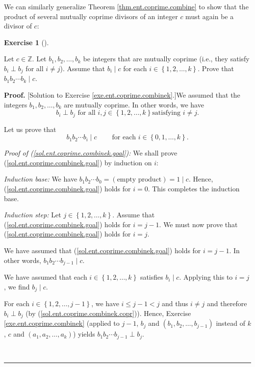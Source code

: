 \documentclass[numbers=enddot,12pt,final,onecolumn,notitlepage]{scrartcl}%
\newcounter{exer}
\numberwithin{exer}{subsection}
\theoremstyle{definition}
\newtheorem{exmp}[exer]{Exercise}
\newenvironment{exercise}[1][]
{\begin{exmp}[#1]\begin{leftbar}}
{\end{leftbar}\end{exmp}}
\newenvironment{fineprint}{\begin{small}}{\end{small}}
\newenvironment{proof}[1][Proof]{\noindent\textbf{#1.} }{\ \rule{0.5em}{0.5em}}
\begin{document}
We can similarly generalize Theorem \ref{thm.ent.coprime.combine} to show that
the product of several mutually coprime divisors of an integer $c$ must again
be a divisor of $c$:

\begin{exercise}
\label{exe.ent.coprime.combinek}Let $c\in\mathbb{Z}$. Let $b_{1},b_{2}%
,\ldots,b_{k}$ be integers that are mutually coprime (i.e., they satisfy
$b_{i}\perp b_{j}$ for all $i\neq j$). Assume that $b_{i}\mid c$ for each
$i\in\left\{  1,2,\ldots,k\right\}  $. Prove that $b_{1}b_{2}\cdots b_{k}\mid
c$.
\end{exercise}

\begin{fineprint}
\begin{proof}
[Solution to Exercise \ref{exe.ent.coprime.combinek}.]We assumed that the
integers $b_{1},b_{2},\ldots,b_{k}$ are mutually coprime. In other words, we
have%
\begin{equation}
b_{i}\perp b_{j}\text{ for all }i,j\in\left\{  1,2,\ldots,k\right\}  \text{
satisfying }i\neq j. \label{sol.ent.coprime.combinek.copr}%
\end{equation}


Let us prove that%
\begin{equation}
b_{1}b_{2}\cdots b_{i}\mid c\ \ \ \ \ \ \ \ \ \ \text{for each }i\in\left\{
0,1,\ldots,k\right\}  . \label{sol.ent.coprime.combinek.goal}%
\end{equation}


\textit{Proof of (\ref{sol.ent.coprime.combinek.goal}):} We shall prove
(\ref{sol.ent.coprime.combinek.goal}) by induction on $i$:

\textit{Induction base:} We have $b_{1}b_{2}\cdots b_{0}=\left(  \text{empty
product}\right)  =1\mid c$. Hence, (\ref{sol.ent.coprime.combinek.goal}) holds
for $i=0$. This completes the induction base.

\textit{Induction step:} Let $j\in\left\{  1,2,\ldots,k\right\}  $. Assume
that (\ref{sol.ent.coprime.combinek.goal}) holds for $i=j-1$. We must now
prove that (\ref{sol.ent.coprime.combinek.goal}) holds for $i=j$.

We have assumed that (\ref{sol.ent.coprime.combinek.goal}) holds for $i=j-1$.
In other words, $b_{1}b_{2}\cdots b_{j-1}\mid c$.

We have assumed that each $i\in\left\{  1,2,\ldots,k\right\}  $ satisfies
$b_{i}\mid c$. Applying this to $i=j$, we find $b_{j}\mid c$.

For each $i\in\left\{  1,2,\ldots,j-1\right\}  $, we have $i\leq j-1<j$ and
thus $i\neq j$ and therefore $b_{i}\perp b_{j}$ (by
(\ref{sol.ent.coprime.combinek.copr})). Hence, Exercise
\ref{exe.ent.coprime.combinek} (applied to $j-1$, $b_{j}$ and $\left(
b_{1},b_{2},\ldots,b_{j-1}\right)  $ instead of $k$, $c$ and $\left(
a_{1},a_{2},\ldots,a_{k}\right)  $) yields $b_{1}b_{2}\cdots b_{j-1}\perp
b_{j}$.


\end{proof}
\end{fineprint}
\end{document}
